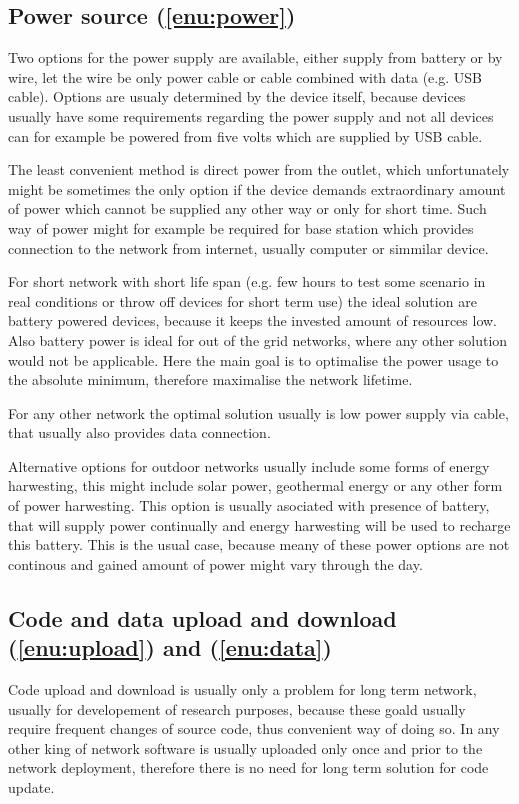 \documentclass[
  digital, %
  table,   %
  nolof,     %
  nolot,     %
           oneside
]{fithesis3}
\begin{document}
  \subsection{Power source (\ref{enu:power})}
  Two options for the power supply are available, either supply from battery or by wire, let the wire be only power cable or cable combined with data (e.g. USB cable). Options are usualy determined by the device itself, because devices usually have some requirements regarding the power supply and not all devices can for example be powered from five volts which are supplied by USB cable.

  The least convenient method is direct power from the outlet, which unfortunately might be sometimes the only option if the device demands extraordinary amount of power which cannot be supplied any other way or only for short time. Such way of power might for example be required for base station which provides connection to the network from internet, usually computer or simmilar device.

  For short network with short life span (e.g. few hours to test some scenario in real conditions or throw off devices for short term use) %
  the ideal solution are battery powered devices, because it keeps the invested amount of resources low. Also battery power is ideal for out of the grid networks, where any other solution would not be applicable. Here the main goal is to optimalise the power usage to the absolute minimum, therefore maximalise the network lifetime.

  For any other network the optimal solution usually is low power supply via cable, that usually also provides data connection.

  Alternative options for outdoor networks usually include some forms of energy harwesting, this might include solar power, geothermal energy or any other form of power harwesting. This option is usually asociated with presence of battery, that will supply power continually and energy harwesting will be used to recharge this battery. This is the usual case, because meany of these power options are not continous and gained amount of power might vary through the day.

  \subsection{Code and data upload and download (\ref{enu:upload}) and (\ref{enu:data})}
  Code upload and download is usually only a problem for long term network, usually for developement of research purposes, because these goald usually require frequent changes of source code, thus convenient way of doing so. In any other king of network software is usually uploaded only once and prior to the network deployment, therefore there is no need for long term solution for code update.
\end{document}
